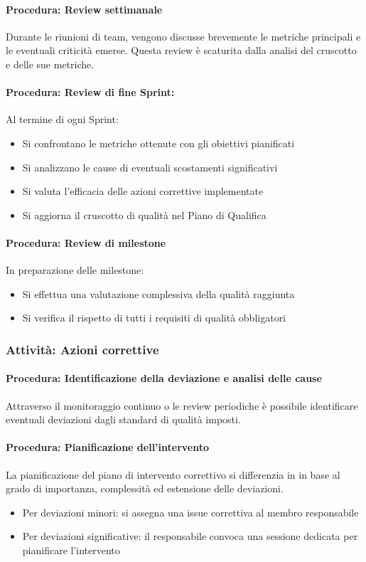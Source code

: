 \documentclass[a4paper,12pt]{article}
\begin{document}
\paragraph{Procedura: Review settimanale}
Durante le riunioni di team, vengono discusse brevemente le metriche principali
e le eventuali criticità emerse. Questa review è scaturita dalla analisi del
cruscotto e delle sue metriche.
\paragraph{Procedura: Review di fine Sprint:}
Al termine di ogni Sprint:
\begin{itemize}
    \item Si confrontano le metriche ottenute con gli obiettivi pianificati
    \item Si analizzano le cause di eventuali scostamenti significativi
    \item Si valuta l'efficacia delle azioni correttive implementate
    \item Si aggiorna il cruscotto di qualità nel Piano di Qualifica
\end{itemize}
\paragraph{Procedura: Review di milestone}
In preparazione delle milestone:
\begin{itemize}
    \item Si effettua una valutazione complessiva della qualità raggiunta
    \item Si verifica il rispetto di tutti i requisiti di qualità obbligatori
\end{itemize}

\subsubsection{Attività: Azioni correttive}\label{azioni_correttive}

\paragraph{Procedura: Identificazione della deviazione e analisi delle cause}
Attraverso il monitoraggio continuo o le review periodiche è possibile
identificare eventuali deviazioni dagli standard di qualità imposti.
\paragraph{Procedura: Pianificazione dell'intervento}
La pianificazione del piano di intervento correttivo si differenzia in in base
al grado di importanza, complessità ed estensione delle deviazioni.
\begin{itemize}
    \item Per deviazioni minori: si assegna una issue correttiva al membro responsabile
    \item Per deviazioni significative: il responsabile convoca una sessione dedicata per
          pianificare l'intervento
\end{itemize}
\end{document}
